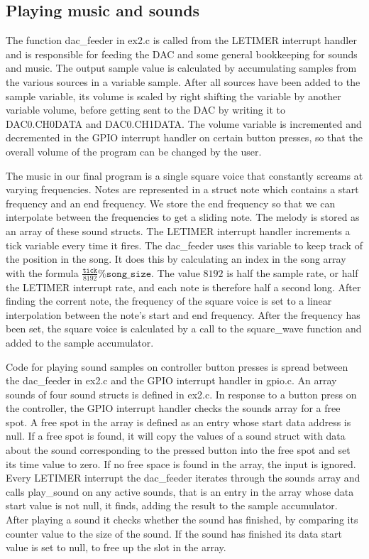 \subsection{Playing music and sounds}

The function dac\_feeder in ex2.c is called from the LETIMER interrupt handler
and is responsible for feeding the DAC and some general bookkeeping for sounds
and music. The output sample value is calculated by accumulating samples from
the various sources in a variable sample. After all sources have been added to
the sample variable, its volume is scaled by right shifting the variable by
another variable volume, before getting sent to the DAC by writing it to
DAC0.CH0DATA and DAC0.CH1DATA. The volume variable is incremented and
decremented in the GPIO interrupt handler on certain button presses, so that the
overall volume of the program can be changed by the user.

The music in our final program is a single square voice that constantly screams
at varying frequencies. Notes are represented in a struct note which contains a
start frequency and an end frequency. We store the end frequency so that we can
interpolate between the frequencies to get a sliding note. The melody is stored
as an array of these sound structs. The LETIMER interrupt handler increments a
tick variable every time it fires. The dac\_feeder uses this variable to keep
track of the position in the song. It does this by calculating an index in the
song array with the formula \( \frac{\texttt{tick}}{8192} \% \texttt{song\_size}
\). The value \( 8192 \) is half the sample rate, or half the LETIMER interrupt
rate, and each note is therefore half a second long. After finding the corrent
note, the frequency of the square voice is set to a linear interpolation between
the note's start and end frequency. After the frequency has been set, the square
voice is calculated by a call to the square\_wave function and added to the
sample accumulator.

Code for playing sound samples on controller button presses is spread between
the dac\_feeder in ex2.c and the GPIO interrupt handler in gpio.c. An array
sounds of four sound structs is defined in ex2.c. In response to a button press
on the controller, the GPIO interrupt handler checks the sounds array for a free
spot. A free spot in the array is defined as an entry whose start data address
is null. If a free spot is found, it will copy the values of a sound struct with
data about the sound corresponding to the pressed button into the free spot and
set its time value to zero. If no free space is found in the array, the input is
ignored. Every LETIMER interrupt the dac\_feeder iterates through the sounds
array and calls play\_sound on any active sounds, that is an entry in the array
whose data start value is not null, it finds, adding the result to the sample
accumulator. After playing a sound it checks whether the sound has finished, by
comparing its counter value to the size of the sound. If the sound has finished
its data start value is set to null, to free up the slot in the array.

